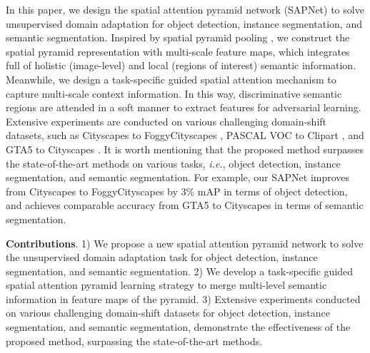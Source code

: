\documentclass[runningheads]{llncs}
\def\ie{{\em i.e.}}
\begin{document}
In this paper, we design the spatial attention pyramid network (SAPNet) to solve unsupervised domain adaptation for object detection, instance segmentation, and semantic segmentation. Inspired by spatial pyramid pooling \cite{DBLP:journals/pami/HeZR015}, we construct the spatial pyramid representation with multi-scale feature maps, which integrates full of holistic (image-level) and local (regions of interest) semantic information. Meanwhile, we design a task-specific guided spatial attention mechanism to capture multi-scale context information. In this way, discriminative semantic regions are attended in a soft manner to extract features for adversarial learning. Extensive experiments are conducted on various challenging domain-shift datasets, such as Cityscapes \cite{DBLP:conf/cvpr/CordtsORREBFRS16} to FoggyCityscapes \cite{DBLP:journals/ijcv/SakaridisDG18}, PASCAL VOC \cite{DBLP:journals/ijcv/EveringhamGWWZ10} to Clipart \cite{DBLP:conf/cvpr/InoueFYA18}, and GTA5 \cite{DBLP:conf/eccv/RichterVRK16} to Cityscapes \cite{DBLP:conf/cvpr/CordtsORREBFRS16}. It is worth mentioning that the proposed method surpasses the state-of-the-art methods on various tasks, \ie, object detection, instance segmentation, and semantic segmentation. For example, our SAPNet improves from Cityscapes \cite{DBLP:conf/cvpr/CordtsORREBFRS16} to FoggyCityscapes \cite{DBLP:journals/ijcv/SakaridisDG18} by $3\%$ mAP in terms of object detection, and achieves comparable accuracy from GTA5 \cite{DBLP:conf/eccv/RichterVRK16} to Cityscapes \cite{DBLP:conf/cvpr/CordtsORREBFRS16} in terms of semantic segmentation.

{\flushleft \textbf{Contributions}}. 1) We propose a new spatial attention pyramid network to solve the unsupervised domain adaptation task for object detection, instance segmentation, and semantic segmentation. 2) We develop a task-specific guided spatial attention pyramid learning strategy to merge multi-level semantic information in feature maps of the pyramid. 3) Extensive experiments conducted on various challenging domain-shift datasets for object detection, instance segmentation, and semantic segmentation, demonstrate the effectiveness of the proposed method, surpassing the state-of-the-art methods.
\end{document}
